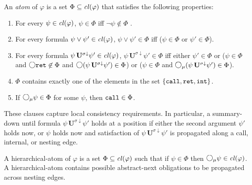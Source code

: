 \documentclass{LMCS}
\newcommand{\M}{{\mu}}
\newcommand{\dm}{\Diamond}
\newcommand{\U}{{\mathbf U}}
\newcommand{\next}{\text{\raisebox{1pt}{$\bigcirc$}}}
\theoremstyle{plain}
\theoremstyle{definition}
\newcommand{\ppath}{\sigma} \newcommand{\Ul}{\U}
\newcommand{\retr}{\mathit{ret}}
\renewcommand{\int}{\intt}
\def\Cl{{\it cl\/}}
\newcommand{\dpuntil}{{\,\U^{\ppath\downarrow}}}
\newcommand{\intt}{{\tt int}}
\newcommand{\rett}{{\tt ret}}
\newcommand{\call}{{\tt call}}
\renewcommand{\retr}{\rett}
\newcommand{\dmm}{\dm_{\M}}
\renewcommand{\dm}{\next}
\renewcommand{\dmm}{\dm_\M}
\begin{document}
An \emph{atom} of $\varphi$ is a set $\Phi \subseteq \Cl(\varphi)$
that satisfies the following properties:
\begin{enumerate}[$\bullet$]
 \item For every $\psi \in \Cl(\varphi)$, 
           $\psi\in \Phi$ iff $\neg \psi \not \in \Phi$ .
 \item For every formula $\psi \vee \psi' \in \Cl(\varphi)$,
           $\psi \vee \psi' \in \Phi$ iff ($\psi \in \Phi$ or $\psi' \in \Phi$).
 \item 
       For every formula $\psi\dpuntil \psi'\in \Cl(\varphi)$,
           $\psi \dpuntil \psi' \in \Phi$ iff
           either $\psi' \in \Phi$ or ($\psi \in \Phi$ and $\next\retr\not\in\Phi$ and
                      $\next(\psi \dpuntil \psi') \in \Phi$) or
 ($\psi\in\Phi$ and $\dmm(\psi \dpuntil \psi') \in \Phi$).
 \item $\Phi$ contains exactly one of the elements in the set $\{\call, \retr, \int\}$.
\item If $\dmm\psi\in\Phi$ for some $\psi$, then $\call\in\Phi$.
\end{enumerate}
These clauses capture local consistency requirements.
In particular, a summary-down until formula $\psi\dpuntil\psi'$ holds at a position if either
the second argument $\psi'$ holds now, or $\psi$ holds now and satisfaction of $\psi\dpuntil\psi'$
is propagated along a call, internal, or nesting edge.

A hierarchical-atom of $\varphi$ is a set $\Phi\subseteq \Cl(\varphi)$ such that
if $\psi\in \Phi$ then $\dmm\psi\in\Cl(\varphi)$.
A hierarchical-atom contains possible abstract-next obligations to be propagated across
nesting edges.
\end{document}
